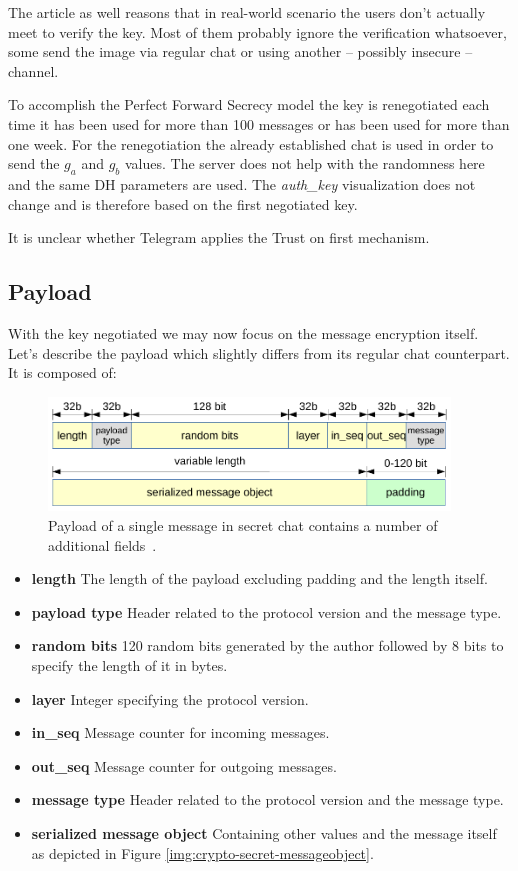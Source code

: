 \documentclass[thesis=M,english]{FITthesis}[2012/10/20]
\begin{document}
The article as well reasons that in real-world scenario the users don't actually meet to verify the key. Most of them probably ignore the verification whatsoever, some send the image via regular chat or using another -- possibly insecure -- channel.

To accomplish the Perfect Forward Secrecy model the key is renegotiated each time it has been used for more than 100 messages or has been used for more than one week. For the renegotiation the already established chat is used in order to send the $g_a$ and $g_b$ values. The server does not help with the randomness here and the same DH parameters are used. The \emph{auth\_key} visualization does not change and is therefore based on the first negotiated key.

It is unclear whether Telegram applies the Trust on first mechanism.


\subsection{Payload}

With the key negotiated we may now focus on the message encryption itself. Let's describe the payload which slightly differs from its regular chat counterpart. It is composed of:

\begin{figure}[htb]
	\centering
	\includegraphics[width=0.95\textwidth]{secret-payload.pdf}
	\caption[Message payload in secret chats]{Payload of a single message in secret chat contains a number of additional fields~\cite{telegram-aarhus}.}
	\label{img:crypto-secret-payload}
\end{figure}

\begin{itemize}
	\item  \textbf{length} The length of the payload excluding padding and the length itself.
	\item  \textbf{payload type} Header related to the protocol version and the message type.
	\item  \textbf{random bits} 120 random bits generated by the author followed by 8 bits to specify the length of it in bytes.
	\item  \textbf{layer} Integer specifying the protocol version.
	\item  \textbf{in\_seq} Message counter for incoming messages.
	\item  \textbf{out\_seq} Message counter for outgoing messages.
	\item  \textbf{message type} Header related to the protocol version and the message type.
	\item  \textbf{serialized message object} Containing other values and the message itself as depicted in Figure \ref{img:crypto-secret-messageobject}.
\end{itemize}
\end{document}
